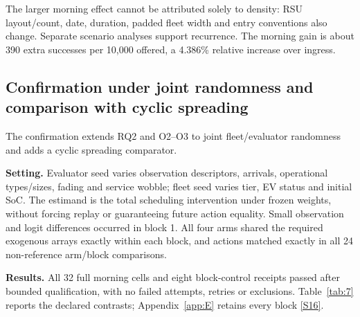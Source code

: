 \documentclass[12pt,a4paper]{article}
\begin{document}
The larger morning effect cannot be attributed solely to density: RSU layout/count, date, duration, padded fleet width and entry conventions also change. Separate scenario analyses support recurrence. The morning gain is about 390 extra successes per 10,000 offered, a 4.386\% relative increase over ingress.

\FloatBarrier
\subsection{Confirmation under joint randomness and comparison with cyclic spreading}\label{sec:3.4}

The confirmation extends RQ2 and O2--O3 to joint fleet/evaluator randomness and adds a cyclic spreading comparator.

\textbf{Setting.} Evaluator seed varies observation descriptors, arrivals, operational types/sizes, fading and service wobble; fleet seed varies tier, EV status and initial SoC. The estimand is the total scheduling intervention under frozen weights, without forcing replay or guaranteeing future action equality. Small observation and logit differences occurred in block 1. All four arms shared the required exogenous arrays exactly within each block, and actions matched exactly in all 24 non-reference arm/block comparisons.

\textbf{Results.} All 32 full morning cells and eight block-control receipts passed after bounded qualification, with no failed attempts, retries or exclusions. Table~\ref{tab:7} reports the declared contrasts; Appendix~\ref{app:E} retains every block \hyperref[source-s16]{[S16]}.
\end{document}
